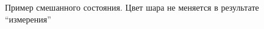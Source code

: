 \begin{figure}
\centering



\caption{Пример смешанного состояния. Цвет шара не меняется в
  результате ``измерения''}
\label{figAddMixStateExample}
\end{figure}
